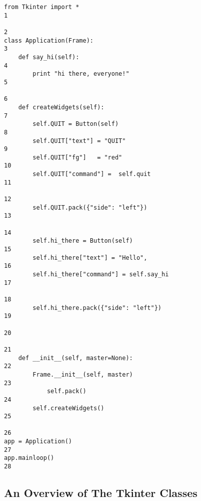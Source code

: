 \begin{verbatim}
from Tkinter import *                                                    1
                                                                         2
class Application(Frame):                                                3
    def say_hi(self):                                                    4
        print "hi there, everyone!"                                      5
                                                                         6
    def createWidgets(self):                                             7
        self.QUIT = Button(self)                                         8
        self.QUIT["text"] = "QUIT"                                       9
        self.QUIT["fg"]   = "red"                                       10
        self.QUIT["command"] =  self.quit                               11
                                                                        12
        self.QUIT.pack({"side": "left"})                                13
                                                                        14
        self.hi_there = Button(self)                                    15
        self.hi_there["text"] = "Hello",                                16
        self.hi_there["command"] = self.say_hi                          17
                                                                        18
        self.hi_there.pack({"side": "left"})                            19
                                                                        20
                                                                        21
    def __init__(self, master=None):                                    22
        Frame.__init__(self, master)                                    23
            self.pack()                                                 24
        self.createWidgets()                                            25
                                                                        26
app = Application()                                                     27
app.mainloop()                                                          28
\end{verbatim}

\ifhtml
\subsection{An Overview of The Tkinter Classes} %


